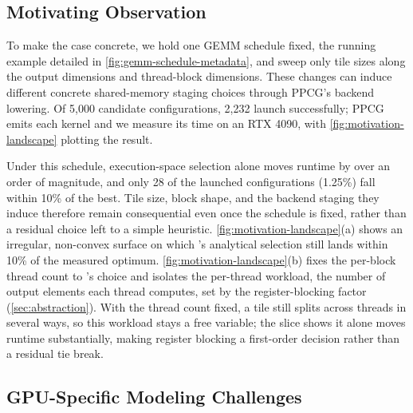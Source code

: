 \subsection{Motivating Observation}
\label{sec:bg-repr}
\label{sec:program-representation}

To make the case concrete, we hold one GEMM schedule fixed, the running example detailed in \autoref{fig:gemm-schedule-metadata}, and sweep only tile sizes along the output dimensions and thread-block dimensions. These changes can induce different concrete shared-memory staging choices through PPCG's backend lowering. Of 5,000 candidate configurations, 2,232 launch successfully; PPCG~\cite{ppcg} emits each kernel and we measure its time on an RTX 4090, with \autoref{fig:motivation-landscape} plotting the result.

Under this schedule, execution-space selection alone moves runtime by over an order of magnitude, and only 28 of the launched configurations (1.25\%) fall within 10\% of the best. Tile size, block shape, and the backend staging they induce therefore remain consequential even once the schedule is fixed, rather than a residual choice left to a simple heuristic. \autoref{fig:motivation-landscape}(a) shows an irregular, non-convex surface on which \name's analytical selection still lands within 10\% of the measured optimum. \autoref{fig:motivation-landscape}(b) fixes the per-block thread count to \name's choice and isolates the per-thread workload, the number of output elements each thread computes, set by the register-blocking factor (\autoref{sec:abstraction}). With the thread count fixed, a tile still splits across threads in several ways, so this workload stays a free variable; the slice shows it alone moves runtime substantially, making register blocking a first-order decision rather than a residual tie break.

\subsection{GPU-Specific Modeling Challenges}
\label{sec:bg-challenges}
\label{sec:gpu-modeling-challenges}

\label{sec:challenge-register-cycle}
\label{sec:challenge-placement}
\label{sec:challenge-discrete-objective}
\label{sec:challenge-register-pressure}

